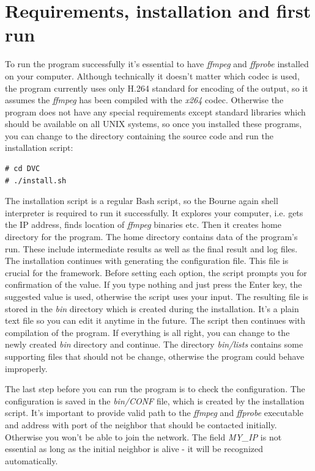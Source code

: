 \section{Requirements, installation and first run}
To run the program successfully it's essential to have \textit{ffmpeg} and \textit{ffprobe} installed on your computer. Although technically it doesn't matter which codec is used, the program currently uses only H.264 standard for encoding of the output, so it assumes the \textit{ffmpeg} has been compiled with the \textit{x264} codec. Otherwise the program does not have any special requirements except standard libraries which should be available on all UNIX systems, so once you installed these programs, you can change to the directory containing the source code and run the installation script:
\begin{verbatim}
# cd DVC
# ./install.sh
\end{verbatim}
The installation script is a regular Bash script, so the Bourne again shell interpreter is required to run it successfully. It explores your computer, i.e. gets the IP address, finds location of \textit{ffmpeg} binaries etc. Then it creates home directory for the program. The home directory contains data of the program's run. These include intermediate results as well as the final result and log files. The installation continues with generating the configuration file. This file is crucial for the framework. Before setting each option, the script prompts you for confirmation of the value. If you type nothing and just press the Enter key, the suggested value is used, otherwise the script uses your input. The resulting file is stored in the \textit{bin} directory which is created during the installation. It's a plain text file so you can edit it anytime in the future. The script then continues with compilation of the program. If everything is all right, you can change to the newly created \textit{bin} directory and continue. The directory \textit{bin/lists} contains some supporting files that should not be change, otherwise the program could behave improperly.

The last step before you can run the program is to check the configuration. The configuration is saved in the \textit{bin/CONF} file, which is created by the installation script. It's important to provide valid path to the \textit{ffmpeg} and \textit{ffprobe} executable and address with port of the neighbor that should be contacted initially. Otherwise you won't be able to join the network. The field \textit{MY\_IP} is not essential as long as the initial neighbor is alive - it will be recognized automatically. 

